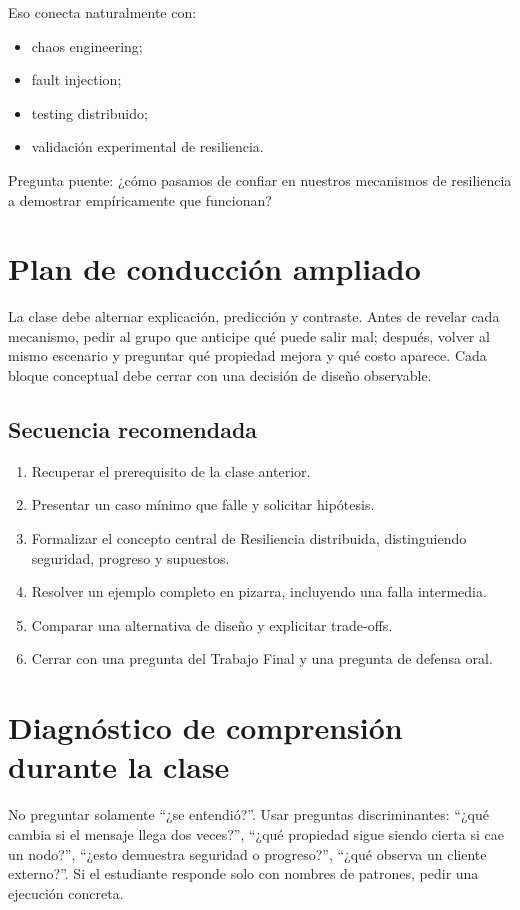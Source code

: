 \documentclass[variant=docente,cover=institutional,mode=screen]{ua-engineering-v6-article}
\begin{document}
Eso conecta naturalmente con:
\begin{itemize}
\item chaos engineering;
\item fault injection;
\item testing distribuido;
\item validación experimental de resiliencia.
\end{itemize}

\begin{uakeybox}
Pregunta puente: ¿cómo pasamos de confiar en nuestros mecanismos de resiliencia a demostrar empíricamente que funcionan?
\end{uakeybox}


\section{Plan de conducción ampliado}
La clase debe alternar explicación, predicción y contraste. Antes de revelar cada mecanismo, pedir al grupo que anticipe qué puede salir mal; después, volver al mismo escenario y preguntar qué propiedad mejora y qué costo aparece. Cada bloque conceptual debe cerrar con una decisión de diseño observable.
\subsection*{Secuencia recomendada}
\begin{enumerate}
\item Recuperar el prerequisito de la clase anterior.
\item Presentar un caso mínimo que falle y solicitar hipótesis.
\item Formalizar el concepto central de Resiliencia distribuida, distinguiendo seguridad, progreso y supuestos.
\item Resolver un ejemplo completo en pizarra, incluyendo una falla intermedia.
\item Comparar una alternativa de diseño y explicitar trade-offs.
\item Cerrar con una pregunta del Trabajo Final y una pregunta de defensa oral.
\end{enumerate}
\section{Diagnóstico de comprensión durante la clase}
No preguntar solamente ``¿se entendió?''. Usar preguntas discriminantes: ``¿qué cambia si el mensaje llega dos veces?'', ``¿qué propiedad sigue siendo cierta si cae un nodo?'', ``¿esto demuestra seguridad o progreso?'', ``¿qué observa un cliente externo?''. Si el estudiante responde solo con nombres de patrones, pedir una ejecución concreta.
\end{document}

